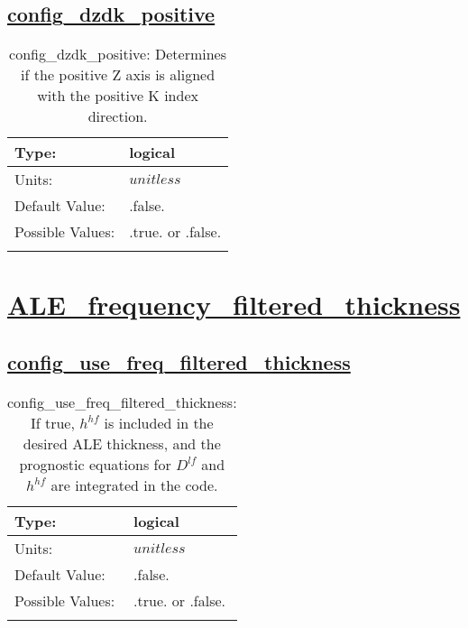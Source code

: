 \subsection[config\_dzdk\_positive]{\hyperref[sec:nm_tab_ALE_vertical_grid]{config\_dzdk\_positive}}
\label{subsec:nm_sec_config_dzdk_positive}
\begin{center}
\begin{longtable}{| p{2.0in} || p{4.0in} |}
    \hline
    Type: & logical \\
    \hline
    Units: & $unitless$ \\
    \hline
    Default Value: & .false. \\
    \hline
    Possible Values: & .true. or .false. \\
    \hline
    \caption{config\_dzdk\_positive: Determines if the positive Z axis is aligned with the positive K index direction.}
\end{longtable}
\end{center}
\section[ALE\_frequency\_filtered\_thickness]{\hyperref[sec:nm_tab_ALE_frequency_filtered_thickness]{ALE\_frequency\_filtered\_thickness}}
\label{sec:nm_sec_ALE_frequency_filtered_thickness}
\subsection[config\_use\_freq\_filtered\_thickness]{\hyperref[sec:nm_tab_ALE_frequency_filtered_thickness]{config\_use\_freq\_filtered\_thickness}}
\label{subsec:nm_sec_config_use_freq_filtered_thickness}
\begin{center}
\begin{longtable}{| p{2.0in} || p{4.0in} |}
    \hline
    Type: & logical \\
    \hline
    Units: & $unitless$ \\
    \hline
    Default Value: & .false. \\
    \hline
    Possible Values: & .true. or .false. \\
    \hline
    \caption{config\_use\_freq\_filtered\_thickness:  If true,  $h^{hf}$  is included in the desired ALE thickness, and the prognostic equations for  $D^{lf}$  and  $h^{hf}$  are integrated in the code.}
\end{longtable}
\end{center}
